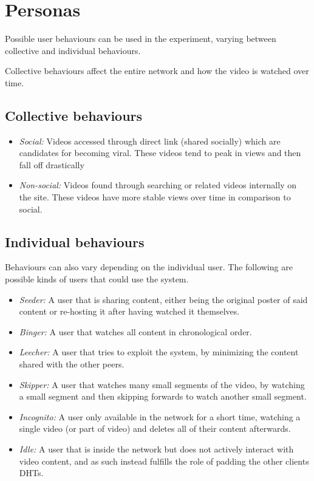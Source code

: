 \section{Personas}
\label{sec:des-persona}
Possible user behaviours can be used in the experiment, varying between collective and individual behaviours.

Collective behaviours affect the entire network and how the video is watched over time.
\subsection{Collective behaviours}
\begin{itemize}
    \item \textit{Social:}
    Videos accessed through direct link (shared socially) which are candidates for becoming viral. These videos tend to peak in views and then fall off drastically
    \item \textit{Non-social:}
    Videos found through searching or related videos internally on the site. These videos have more stable views over time in comparison to social.
\end{itemize}

\subsection{Individual behaviours}
\label{sec:individual-behavious}
Behaviours can also vary depending on the individual user. The following are possible kinds of users that could use the system.
\begin{itemize}
    \item \textit{Seeder:}
    A user that is sharing content, either being the original poster of said content or re-hosting it after having watched it themselves.

    \item \textit{Binger:}
    A user that watches all content in chronological order.
    
    \item \textit{Leecher:}
    A user that tries to exploit the system, by minimizing the content shared with the other peers.

    \item \textit{Skipper:}
    A user that watches many small segments of the video, by watching a small segment and then skipping forwards to watch another small segment.
    
    \item \textit{Incognito:}
    A user only available in the network for a short time, watching a single video (or part of video) and deletes all of their content afterwards.
    
    \item \textit{Idle:}
    A user that is inside the network but does not actively interact with video content, and as such instead fulfills the role of padding the other clients \acp{DHT}.
\end{itemize}

